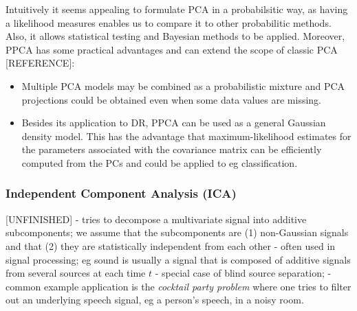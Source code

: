 \documentclass[journal, a4paper]{IEEEtran}
\begin{document}
Intuitively it seems appealing to formulate PCA in a probabilsitic way, as having a likelihood measures enables us to compare it to other probabilitic methods. Also, it allows statistical testing and Bayesian methods to be applied. 
Moreover, PPCA has some practical advantages and can extend the scope of classic PCA [REFERENCE]:
\begin{itemize}
	\item  Multiple PCA models may be combined as a probabilistic mixture and PCA projections could be obtained even when some data values are missing.
	\item Besides its application to DR, PPCA can be used as a general Gaussian density model. This has the advantage that maximum-likelihood estimates for the parameters associated with the covariance matrix can be efficiently computed from the PCs and could be applied to eg classification. 
\end{itemize}


\hfill
\subsubsection{Independent Component Analysis (ICA)}
[UNFINISHED]
- tries to decompose a multivariate signal into additive subcomponents;
we assume that the subcomponents are (1) non-Gaussian signals and that (2) they are statistically independent from each other
- often used in signal processing; eg sound is usually a signal that is composed of additive signals from several sources at each time \( t \)
- special case of blind source separation;
- common example application is the \textit{cocktail party problem} where one tries to filter out an underlying speech signal, eg a person's speech, in a noisy room. 

\end{document}
